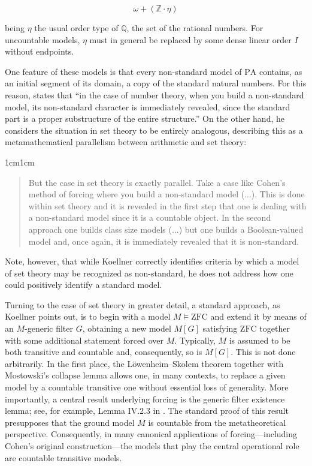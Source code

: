 \documentclass[11pt,a4paper]{book}
\theoremstyle{plain}
\begin{document}
$$\omega + (\mathbb{Z} \cdot \eta) $$

being $\eta$ the usual order type of $\mathbb{Q}$, the set of the rational numbers. For uncountable models, $\eta$ must in general be replaced by some dense linear order $I$ without endpoints.

One feature of these models is that every non-standard model of $\mathrm{PA}$ contains, as an initial segment of its domain, a copy of the standard natural numbers. For this reason, \textcite[p.~512]{Koellner2016} states that “in the case of number theory, when you build a non-standard model, its non-standard character is immediately revealed, since the standard part is a proper substructure of the entire structure.” On the other hand, he considers the situation in set theory to be entirely analogous, describing this as a metamathematical parallelism between arithmetic and set theory:

\begin{adjustwidth}{1cm}{1cm}
\begin{quote}
\small
But the case in set theory is exactly parallel. Take a case like Cohen's method of forcing where you build a non-standard model (...). This is done within set theory and it is revealed in the first step that one is dealing with a non-standard model since it is a countable object. In the second approach one builds class size models (...) but one builds a Boolean-valued model and, once again, it is immediately revealed that it is non-standard.
\end{quote}
\end{adjustwidth}

Note, however, that while Koellner correctly identifies criteria by which a model of set theory may be recognized as non-standard, he does not address how one could positively identify a standard model.

Turning to the case of set theory in greater detail, a standard approach, as Koellner points out, is to begin with a model \(M \models \mathrm{ZFC}\) and extend it by means of an \(M\)-generic filter \(G\), obtaining a new model \(M[G]\) satisfying \(\mathrm{ZFC}\) together with some additional statement forced over \(M\). Typically, \(M\) is assumed to be both transitive and countable and, consequently, so is \(M[G]\). This is not done arbitrarily. In the first place, the Löwenheim--Skolem theorem together with Mostowski's collapse lemma allows one, in many contexts, to replace a given model by a countable transitive one without essential loss of generality. More importantly, a central result underlying forcing is the generic filter existence lemma; see, for example, Lemma IV.2.3 in \textcite[p.~246]{Kunen2011}. The standard proof of this result presupposes that the ground model \(M\) is countable from the metatheoretical perspective. Consequently, in many canonical applications of forcing---including Cohen's original construction---the models that play the central operational role are countable transitive models.
\end{document}
